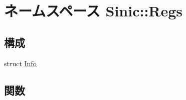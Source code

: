\hypertarget{namespaceSinic_1_1Regs}{
\section{ネームスペース Sinic::Regs}
\label{namespaceSinic_1_1Regs}
}
\subsection*{構成}
\begin{DoxyCompactItemize}
\item 
struct \hyperlink{structSinic_1_1Regs_1_1Info}{Info}
\end{DoxyCompactItemize}
\subsection*{関数}
